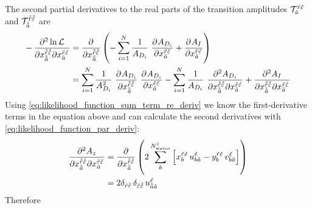 The second partial derivatives \wrt to the real parts of the
transition amplitudes
$\mathcal{T}_{\tilde{a}}^{\tilde{r} \tilde{\varepsilon}}$ and
$\mathcal{T}_{\tilde{\tilde{a}}}^{\tilde{\tilde{r}} \tilde{\tilde{\varepsilon}}}$
are
\begin{align}
  -\dmd{\ln \mathcal{L}}{2}{{x_{\doubletilde{a}}^{\doubletilde{r} \doubletilde{\refl}}}}{}{{x_{\tilde{a}}^{\tilde{r} \tilde{\refl}}}}{}
  &= \dpd{}{{x_{\doubletilde{a}}^{\doubletilde{r} \doubletilde{\refl}}}}
    \rBrk{-\sum_{i = 1}^{N} \frac{1}{A_{D_i}}\, \dpd{A_{D_i}}{{x_{\tilde{a}}^{\tilde{r} \tilde{\refl}}}} + \dpd{A_I}{{x_{\tilde{a}}^{\tilde{r} \tilde{\refl}}}}} \\
  &= \sum_{i = 1}^{N} \frac{1}{A_{D_i}^2}\, \dpd{A_{D_i}}{{x_{\doubletilde{a}}^{\doubletilde{r} \doubletilde{\refl}}}}\, \dpd{A_{D_i}}{{x_{\tilde{a}}^{\tilde{r} \tilde{\refl}}}}
    - \sum_{i = 1}^{N} \frac{1}{A_{D_i}}\, \dmd{A_{D_i}}{2}{{x_{\doubletilde{a}}^{\doubletilde{r} \doubletilde{\refl}}}}{}{{x_{\tilde{a}}^{\tilde{r} \tilde{\refl}}}}{}
    + \dmd{A_I}{2}{{x_{\doubletilde{a}}^{\doubletilde{r} \doubletilde{\refl}}}}{}{{x_{\tilde{a}}^{\tilde{r} \tilde{\refl}}}}{}
\end{align}
Using \cref{eq:likelihood_function_sum_term_re_deriv} we know the
first-derivative terms in the equation above and can calculate the
second derivatives with \cref{eq:likelihood_function_par_deriv}:
\begin{align}
  \dmd{A_z}{2}{{x_{\doubletilde{a}}^{\doubletilde{r} \doubletilde{\refl}}}}{}{{x_{\tilde{a}}^{\tilde{r} \tilde{\refl}}}}{}
  &= \dpd{}{{x_{\doubletilde{a}}^{\doubletilde{r} \doubletilde{\refl}}}}
    \rBrk{2 \sum_b^{N^{\tilde{\refl}}_\text{waves}} \sBrk{x_b^{\tilde{r} \tilde{\refl}}\, u^{\tilde{\refl}}_{b \tilde{a}}
    - y_b^{\tilde{r} \tilde{\refl}}\, v^{\tilde{\refl}}_{b \tilde{a}}}} \\
  \label{eq:likelihood_function_sum_term_re_re_deriv}
  &= 2 \delta_{\tilde{r} \doubletilde{r}}\, \delta_{\tilde{\refl} \doubletilde{\refl}}\, u^{\tilde{\refl}}_{\doubletilde{a} \tilde{a}}
\end{align}
Therefore
